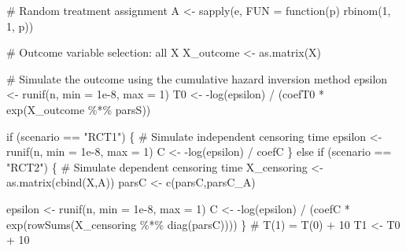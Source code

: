 \documentclass[
  11pt,
  a4paper,
]{article}
\newenvironment{Shaded}{}{}
\newcommand{\AttributeTok}[1]{\textcolor[rgb]{0.84,0.23,0.29}{#1}}
\newcommand{\CommentTok}[1]{\textcolor[rgb]{0.42,0.45,0.49}{#1}}
\newcommand{\ControlFlowTok}[1]{\textcolor[rgb]{0.84,0.23,0.29}{#1}}
\newcommand{\DecValTok}[1]{\textcolor[rgb]{0.00,0.36,0.77}{#1}}
\newcommand{\FloatTok}[1]{\textcolor[rgb]{0.00,0.36,0.77}{#1}}
\newcommand{\FunctionTok}[1]{\textcolor[rgb]{0.44,0.26,0.76}{#1}}
\newcommand{\NormalTok}[1]{\textcolor[rgb]{0.14,0.16,0.18}{#1}}
\newcommand{\OtherTok}[1]{\textcolor[rgb]{0.44,0.26,0.76}{#1}}
\newcommand{\SpecialCharTok}[1]{\textcolor[rgb]{0.00,0.36,0.77}{#1}}
\newcommand{\StringTok}[1]{\textcolor[rgb]{0.01,0.18,0.38}{#1}}
\theoremstyle{plain}
\theoremstyle{plain}
\theoremstyle{plain}
\theoremstyle{definition}
\theoremstyle{remark}
\begin{document}
\begin{Shaded}
\begin{Highlighting}[]
  \CommentTok{\# Random treatment assignment}
\NormalTok{  A }\OtherTok{\textless{}{-}} \FunctionTok{sapply}\NormalTok{(e, }\AttributeTok{FUN =} \ControlFlowTok{function}\NormalTok{(p) }\FunctionTok{rbinom}\NormalTok{(}\DecValTok{1}\NormalTok{, }\DecValTok{1}\NormalTok{, p))}
  
  \CommentTok{\# Outcome variable selection: all X}
\NormalTok{  X\_outcome }\OtherTok{\textless{}{-}} \FunctionTok{as.matrix}\NormalTok{(X)}
  
  \CommentTok{\# Simulate the outcome using the cumulative hazard inversion method}
\NormalTok{  epsilon }\OtherTok{\textless{}{-}} \FunctionTok{runif}\NormalTok{(n, }\AttributeTok{min =} \FloatTok{1e{-}8}\NormalTok{, }\AttributeTok{max =} \DecValTok{1}\NormalTok{)}
\NormalTok{  T0 }\OtherTok{\textless{}{-}} \SpecialCharTok{{-}}\FunctionTok{log}\NormalTok{(epsilon) }\SpecialCharTok{/}\NormalTok{ (coefT0 }\SpecialCharTok{*} \FunctionTok{exp}\NormalTok{(X\_outcome }\SpecialCharTok{\%*\%}\NormalTok{ parsS))}
  
  \ControlFlowTok{if}\NormalTok{ (scenario }\SpecialCharTok{==} \StringTok{"RCT1"}\NormalTok{) \{}
    \CommentTok{\# Simulate independent censoring time}
\NormalTok{    epsilon }\OtherTok{\textless{}{-}} \FunctionTok{runif}\NormalTok{(n, }\AttributeTok{min =} \FloatTok{1e{-}8}\NormalTok{, }\AttributeTok{max =} \DecValTok{1}\NormalTok{)}
\NormalTok{    C }\OtherTok{\textless{}{-}} \SpecialCharTok{{-}}\FunctionTok{log}\NormalTok{(epsilon) }\SpecialCharTok{/}\NormalTok{ coefC}
\NormalTok{  \}}
  \ControlFlowTok{else} \ControlFlowTok{if}\NormalTok{ (scenario }\SpecialCharTok{==} \StringTok{"RCT2"}\NormalTok{) \{}
    \CommentTok{\# Simulate dependent censoring time}
\NormalTok{    X\_censoring }\OtherTok{\textless{}{-}} \FunctionTok{as.matrix}\NormalTok{(}\FunctionTok{cbind}\NormalTok{(X,A))}
\NormalTok{    parsC }\OtherTok{\textless{}{-}} \FunctionTok{c}\NormalTok{(parsC,parsC\_A)}
    
\NormalTok{    epsilon }\OtherTok{\textless{}{-}} \FunctionTok{runif}\NormalTok{(n, }\AttributeTok{min =} \FloatTok{1e{-}8}\NormalTok{, }\AttributeTok{max =} \DecValTok{1}\NormalTok{)}
\NormalTok{    C }\OtherTok{\textless{}{-}} \SpecialCharTok{{-}}\FunctionTok{log}\NormalTok{(epsilon) }\SpecialCharTok{/}\NormalTok{ (coefC }\SpecialCharTok{*} \FunctionTok{exp}\NormalTok{(}\FunctionTok{rowSums}\NormalTok{(X\_censoring }\SpecialCharTok{\%*\%} \FunctionTok{diag}\NormalTok{(parsC))))}
\NormalTok{  \}}
  \CommentTok{\# T(1) = T(0) + 10}
\NormalTok{  T1 }\OtherTok{\textless{}{-}}\NormalTok{ T0 }\SpecialCharTok{+} \DecValTok{10}
  

\end{Highlighting}
\end{Shaded}
\end{document}
